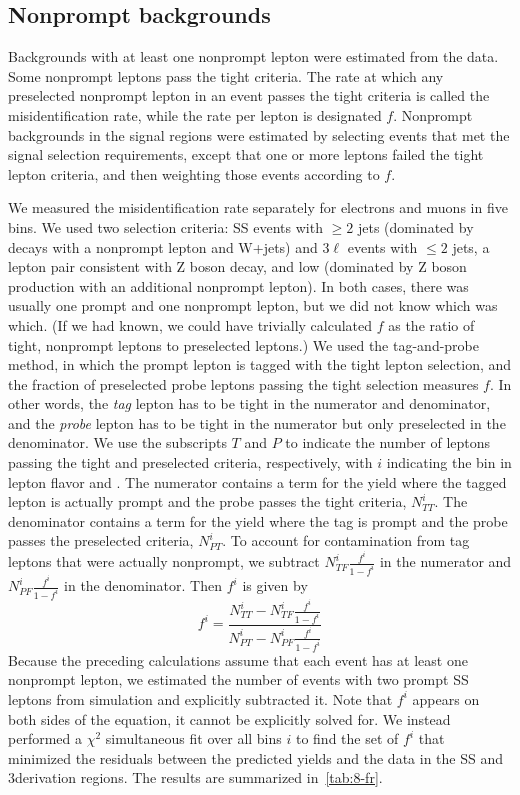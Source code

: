\subsection{Nonprompt backgrounds}
\label{ssec:8-TeV-nonprompt}
Backgrounds with at least one nonprompt lepton were estimated from the data. Some
nonprompt leptons pass the tight criteria. The rate at which any
preselected nonprompt lepton in an event passes the tight criteria is called the
misidentification rate, while the rate per lepton is designated $f$. Nonprompt
backgrounds in the signal regions were estimated by selecting events that met
the signal selection requirements, except that one or more leptons failed the tight
lepton criteria, and then weighting those events according to $f$.

We measured the misidentification rate separately for electrons and muons in
five \pT bins. We used two selection criteria: SS events with $\ge2$ jets
(dominated by \ttbar decays with a nonprompt lepton and W+jets) and 3$\ell$
events with $\le2$ jets, a lepton pair consistent with Z boson decay, and low
\pTmiss (dominated by Z boson production with an additional nonprompt lepton).
In both cases, there was usually one prompt and one nonprompt lepton, but we did
not know which was which. (If we had known, we could have trivially calculated
$f$ as the ratio of tight, nonprompt leptons to preselected leptons.) We used
the tag-and-probe method, in which the prompt lepton is tagged with the tight
lepton selection, and the fraction of preselected probe leptons passing the
tight selection measures $f$. In other words, the \emph{tag} lepton has to be
tight in the numerator and denominator, and the \emph{probe} lepton has to be
tight in the numerator but only preselected in the denominator. We use the
subscripts $T$ and $P$ to indicate the number of leptons passing the tight and
preselected criteria, respectively, with $i$ indicating the bin in lepton flavor
and \pT. The numerator contains a term for the yield where the tagged lepton is
actually prompt and the probe passes the tight criteria, $N^i_{TT}$. The
denominator contains a term for the yield where the tag is prompt and the probe
passes the preselected criteria, $N^i_{PT}$. To account for contamination from
tag leptons that were actually nonprompt, we subtract
$N^i_{TF}\frac{f^i}{1-f^i}$ in the numerator and $N^i_{PF}\frac{f^i}{1-f^i}$ in
the denominator. Then $f^i$ is given by
\begin{equation}
  f^i = \frac{N^i_{TT} - N^i_{TF}\frac{f^i}{1-f^i}}{N^i_{PT} - N^i_{PF}\frac{f^i}{1-f^i}}
\end{equation}
Because the preceding calculations assume that each event has at least one
nonprompt lepton, we estimated the number of events with two prompt SS leptons
from simulation and explicitly subtracted it. Note that $f^i$ appears on both
sides of the equation, it cannot be explicitly solved for. We instead performed
a $\chi^2$ simultaneous fit over all bins $i$ to find the set of $f^i$ that
minimized the residuals between the predicted yields and the data in the SS and
3\lep derivation regions. The results are summarized in~\cref{tab:8-fr}.

